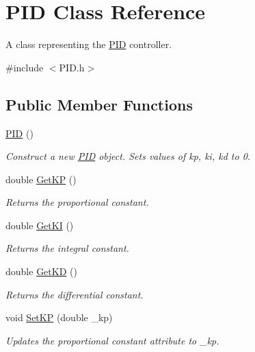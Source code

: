\hypertarget{classPID}{}\section{P\+ID Class Reference}
\label{classPID}


A class representing the \hyperlink{classPID}{P\+ID} controller.  




{\ttfamily \#include $<$P\+I\+D.\+h$>$}

\subsection*{Public Member Functions}
\begin{DoxyCompactItemize}
\item 
\mbox{\label{classPID_a0311b6f7de348499ce24e53ba353514a}} 
\hyperlink{classPID_a0311b6f7de348499ce24e53ba353514a}{P\+ID} ()
\begin{DoxyCompactList}\small\item\em Construct a new \hyperlink{classPID}{P\+ID} object. Sets values of kp, ki, kd to 0. \end{DoxyCompactList}\item 
double \hyperlink{classPID_a0b9d04c13dc740eaf8f7ce408ebe2fe5}{Get\+KP} ()
\begin{DoxyCompactList}\small\item\em Returns the proportional constant. \end{DoxyCompactList}\item 
double \hyperlink{classPID_aff6252318303da61600d6d10bd16cc83}{Get\+KI} ()
\begin{DoxyCompactList}\small\item\em Returns the integral constant. \end{DoxyCompactList}\item 
double \hyperlink{classPID_ab36efdea8287d9389fa9ef83b35569b2}{Get\+KD} ()
\begin{DoxyCompactList}\small\item\em Returns the differential constant. \end{DoxyCompactList}\item 
void \hyperlink{classPID_af0770e8c485faac734274e91692ec005}{Set\+KP} (double \+\_\+kp)
\begin{DoxyCompactList}\small\item\em Updates the proportional constant attribute to \+\_\+kp. \end{DoxyCompactList}\item 

\end{DoxyCompactItemize}
